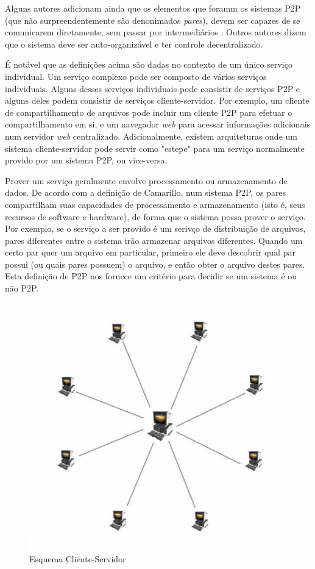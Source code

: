 \documentclass[a4paper]{article}
\begin{document}
Alguns autores adicionam ainda que os elementos que foramm os sistemas P2P (que não surpreendentemente são denonimados \textit{pares}), devem ser capazes de se comunicarem diretamente, sem passar por intermediários \cite{schollmeier2001}. Outros autores dizem que o sistema deve ser auto-organizável e ter controle decentralizado\cite{roussopoulos2004}.

É notável que as definições acima são dadas no contexto de um único serviço individual. Um serviço complexo pode ser composto de vários serviços individuais. Alguns desses serviços individuais pode consistir de serviços P2P e alguns deles podem consistir de serviços cliente-servidor. Por exemplo, um cliente de compartilhamento de arquivos pode incluir um cliente P2P para efetuar o compartilhamento em si, e um navegador \textit{web} para acessar informações adicionais num servidor \textit{web} centralizado. Adicionalmente, existem arquiteturas onde um sistema cliente-servidor pode servir como "estepe" para um serviço normalmente provido por um sistema P2P, ou vice-versa. \cite{camarillop2parch}

Prover um serviço geralmente envolve processamento ou armazenamento de dados. De acordo com a definição de Camarillo, num sistema P2P, os pares compartilham suas capacidades de processamento e armazenamento (isto é, seus recursos de software e hardware), de forma que o sistema possa prover o serviço. Por exemplo, se o serviço a ser provido é um serivço de distribuição de arquivos, pares diferentes entre o sistema irão armazenar arquivos diferentes. Quando um certo par quer um arquivo em particular, primeiro ele deve descobrir qual par possui (ou quais pares possuem) o arquivo, e então obter o arquivo destes pares\cite{camarillop2parch}. Esta definição de P2P nos fornece um critério para decidir se um sistema é ou não P2P.


\begin{figure}[!ht]
\begin{center}
  \includegraphics{img//cliente-servidor.png}
  \caption{Esquema Cliente-Servidor\cite{sisp2p}} 
\end{center}
\end{figure}
\end{document}
